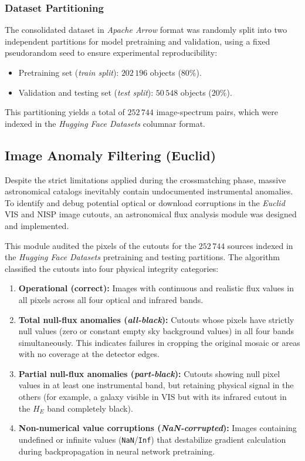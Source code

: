 \subsubsection{Dataset Partitioning}

The consolidated dataset in \textit{Apache Arrow} format was randomly split into two independent partitions for model pretraining and validation, using a fixed pseudorandom seed to ensure experimental reproducibility:

\begin{itemize}
\item Pretraining set (\textit{train split}): $202\,196$ objects ($80\%$).
\item Validation and testing set (\textit{test split}): $50\,548$ objects ($20\%$).
\end{itemize}

This partitioning yields a total of $252\,744$ image-spectrum pairs, which were indexed in the \textit{Hugging Face Datasets} columnar format.

\subsection{Image Anomaly Filtering (Euclid)}

Despite the strict limitations applied during the crossmatching phase, massive astronomical catalogs inevitably contain undocumented instrumental anomalies. To identify and debug potential optical or download corruptions in the \textit{Euclid} VIS and NISP image cutouts, an astronomical flux analysis module was designed and implemented.

This module audited the pixels of the cutouts for the $252\,744$ sources indexed in the \textit{Hugging Face Datasets} pretraining and testing partitions. The algorithm classified the cutouts into four physical integrity categories:

\begin{enumerate}
\item \textbf{Operational (correct):} Images with continuous and realistic flux values in all pixels across all four optical and infrared bands.
\item \textbf{Total null-flux anomalies (\textit{all-black}):} Cutouts whose pixels have strictly null values (zero or constant empty sky background values) in all four bands simultaneously. This indicates failures in cropping the original mosaic or areas with no coverage at the detector edges.
\item \textbf{Partial null-flux anomalies (\textit{part-black}):} Cutouts showing null pixel values in at least one instrumental band, but retaining physical signal in the others (for example, a galaxy visible in VIS but with its infrared cutout in the $H_E$ band completely black).
\item \textbf{Non-numerical value corruptions (\textit{NaN-corrupted}):} Images containing undefined or infinite values (\texttt{NaN}/\texttt{Inf}) that destabilize gradient calculation during backpropagation in neural network pretraining.
\end{enumerate}

